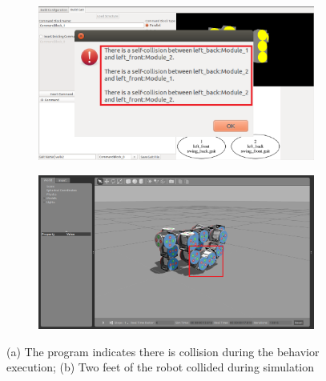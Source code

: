 \documentclass[graybox]{svmult}
\begin{document}
\begin{figure}
\begin{center}
        \begin{subfigure}[b]{0.48\columnwidth}
                \includegraphics[width=\textwidth]{images/designer_gait_collision.png}
                \caption{}
                \label{fig:gait_collision}
           \end{subfigure}
        \begin{subfigure}[b]{0.48\columnwidth}
                \includegraphics[width=\textwidth]{images/gazebo_gait_collision.png}
                \caption{}
                \label{fig:gait_collision2}
        \end{subfigure}
\end{center}
\caption{(a) The program indicates there is collision during the behavior execution; (b) Two feet of  the robot collided during simulation}
\label{fig:gait_unstable}
\end{figure}
\end{document}
